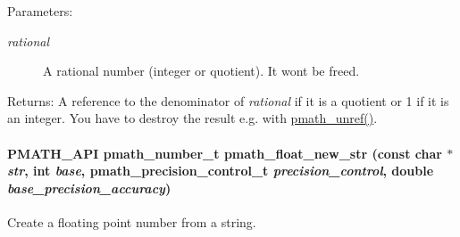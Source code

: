 \begin{Desc}
\item[Parameters:]
\begin{description}
\item[{\em rational}]A rational number (integer or quotient). It wont be freed. \end{description}
\end{Desc}
\begin{Desc}
\item[Returns:]A reference to the denominator of {\em rational\/} if it is a quotient or 1 if it is an integer. You have to destroy the result e.g. with \hyperlink{classpmath__t_54e905402c38940687033b87eb8c6c9f}{pmath\_\-unref()}. \end{Desc}
\hypertarget{group__numbers_g6c67d61f1a57084cc46e858a307ec461}{
\paragraph[{pmath\_\-float\_\-new\_\-str}]{\setlength{\rightskip}{0pt plus 5cm}PMATH\_\-API {\bf pmath\_\-number\_\-t} pmath\_\-float\_\-new\_\-str (const char $\ast$ {\em str}, \/  int {\em base}, \/  pmath\_\-precision\_\-control\_\-t {\em precision\_\-control}, \/  double {\em base\_\-precision\_\-accuracy})}\hfill}
\label{group__numbers_g6c67d61f1a57084cc46e858a307ec461}


Create a floating point number from a string. 

